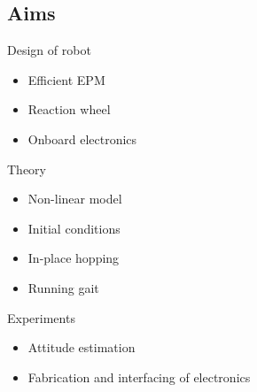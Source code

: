 \subsection*{Aims}
\begin{frame}
{
\begin{block}{Design of robot}
\begin{itemize}
  \item Efficient EPM\\[0.1in]
  \item Reaction wheel\\[0.1in]
  \item Onboard electronics
\end{itemize}
\end{block}
}
{
\begin{block}{Theory}
\begin{itemize}
  \item Non-linear model\\[0.1in]
  \item Initial conditions\\[0.1in]
  \item In-place hopping\\[0.1in]
  \item Running gait
\end{itemize}
\end{block}
}
{
\begin{block}{Experiments}
\begin{itemize}
  \item Attitude estimation\\[0.1in]
  \item Fabrication and interfacing of electronics
\end{itemize}
\end{block}
}
\end{frame}

